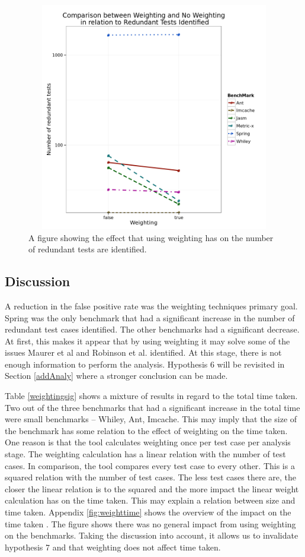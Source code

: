 \begin{figure}[h]
\begin{center}
\includegraphics[height=10cm, width = 14.5cm]{Weighting.png}
\end{center}
\caption{A figure showing the effect that using weighting has on the number of redundant tests are identified.}
\label{fig:weightgraph}
\end{figure}

\subsection{Discussion}
A reduction in the false positive rate was the weighting techniques primary goal. Spring was the only benchmark that had a significant increase in the number of redundant test cases identified. The other benchmarks had a significant decrease. At first, this makes it appear that by using weighting it may solve some of the issues Maurer et al  \cite{koochakzadeh2009test} and Robinson et al. \cite{li2008static} identified. At this stage, there is not enough information to perform the analysis. Hypothesis 6 will be revisited in Section \ref{addAnaly} where a stronger conclusion can be made.

Table \ref{weightingsig} shows a mixture of results in regard to the total time taken. Two out of the three benchmarks that had a significant increase in the total time were small benchmarks -- Whiley, Ant, Imcache. This may imply that the size of the benchmark has some relation to the effect of weighting on the time taken. One reason is that the tool calculates weighting once per test case per analysis stage. The weighting calculation has a linear relation with the number of test cases. In comparison, the tool compares every test case to every other. This is a squared relation with the number of test cases. The less test cases there are, the closer the linear relation is to the squared and the more impact the linear weight calculation has on the time taken. This may explain a relation between size and time taken. Appendix \ref{fig:weighttime} shows the overview of the impact on the time taken . The figure shows there was no general impact from using weighting on the benchmarks. Taking the discussion into account, it allows us to invalidate hypothesis 7 and that weighting does not affect time taken.

